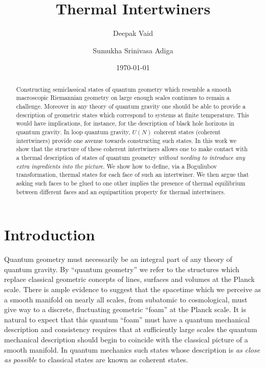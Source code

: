 \documentclass[twocolumn,draft,aps,nofootinbib,nobibnotes,final]{revtex4-2}
\begin{document}

\title{Thermal Intertwiners}

\author{Deepak Vaid}
\affiliation{}
\author{Sumukha Srinivasa Adiga}
\affiliation{}

\date{\today}

\begin{abstract}
Constructing semiclassical states of quantum geometry which resemble a smooth macroscopic Riemannian geometry on large enough scales continues to remain a challenge. Moreover in any theory of quantum gravity one should be able to provide a description of geometric states which correspond to systems at finite temperature. This would have implications, for instance, for the description of black hole horizons in quantum gravity. In loop quantum gravity, $ U(N) $ coherent states (coherent intertwiners) provide one avenue towards constructing such states. In this work we show that the structure of these coherent intertwiners allows one to make contact with a thermal description of states of quantum geometry \textit{without needing to introduce any extra ingredients into the picture}. We show how to define, via a Boguliubov transformation, thermal states for each face of such an intertwiner. We then argue that asking such faces to be glued to one other implies the presence of thermal equilibrium between different faces and an equipartition property for thermal intertwiners.
\end{abstract}

\maketitle

\tableofcontents

\listoftodos

\section{Introduction}

Quantum geometry must necessarily be an integral part of any theory of quantum gravity. By ``quantum geometry'' we refer to the structures which replace classical geometric concepts of lines, surfaces and volumes at the Planck scale. There is ample evidence to suggest that the spacetime which we perceive as a smooth manifold on nearly all scales, from subatomic to cosmological, must give way to a discrete, fluctuating geometric ``foam'' at the Planck scale. It is natural to expect that this quantum ``foam'' must have a quantum mechanical description and consistency requires that at sufficiently large scales the quantum mechanical description should begin to coincide with the classical picture of a smooth manifold. In quantum mechanics such states whose description is \textit{as close as possible} to classical states are known as coherent states.
\end{document}
